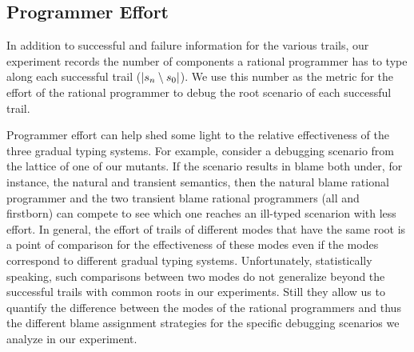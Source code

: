 \subsection{Programmer Effort}

In addition to successful and failure information for the various trails,  
our experiment  records the number of components a rational programmer 
has to type along each successful trail ($\lvert s_n \setminus s_0
\rvert$). We use this number as the metric for the effort 
of the rational programmer to debug the root scenario of each successful trail.  

Programmer effort can help shed some light to the relative effectiveness of the
three gradual typing systems. For example, consider a debugging scenario from  the
lattice of one of our mutants.  If the
scenario results in blame both under, for instance, the natural and transient semantics,
then the natural blame rational programmer and the two transient blame
rational programmers (all and firstborn) can compete to see which one
reaches an ill-typed scenarion with less effort. In
general, the effort of trails of different modes that have the same
root is a point of comparison for the effectiveness of these
modes even if the modes correspond to different gradual typing systems.
Unfortunately, statistically speaking, such comparisons between two modes do not generalize 
beyond the successful trails with common roots in our experiments.
Still they allow us to quantify the difference between the modes of the rational
programmers and thus the different blame assignment strategies  for the specific
debugging scenarios we analyze in our experiment.
